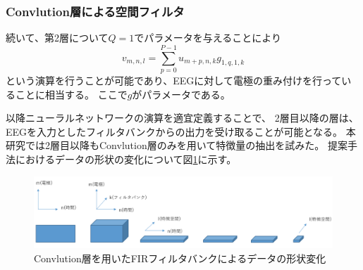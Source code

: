 \subsubsection{\rm Convlution\mc 層による空間フィルタ}
続いて、第2層について\(Q=1\)でパラメータを与えることにより
\begin{equation}
    v_{m,n,l} = \sum_{p=0}^{P-1} u_{m+p,n,k} g_{1,q,1,k}
    \label{eq:pseudoFIR}
\end{equation} 
という演算を行うことが可能であり、EEGに対して電極の重み付けを行っていることに相当する。
ここで\(g\)がパラメータである。

以降ニューラルネットワークの演算を適宜定義することで、
2層目以降の層は、EEGを入力としたフィルタバンクからの出力を受け取ることが可能となる。
本研究では2層目以降もConvlution層のみを用いて特徴量の抽出を試みた。
提案手法におけるデータの形状の変化について図\ref{fig:pseudFBCSP}に示す。
\begin{figure}[t]
    \centering
    \includegraphics[width=13cm]{images/pseudFBCSP.png}
    \caption{Convlution層を用いたFIRフィルタバンクによるデータの形状変化}
    \label{fig:pseudFBCSP}
\end{figure}

